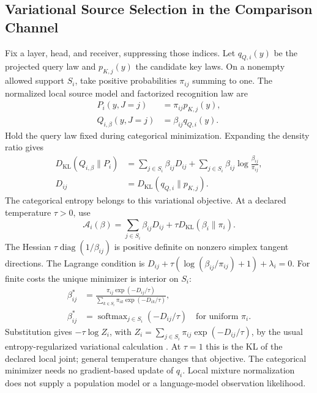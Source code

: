 \documentclass[twoside,11pt]{article}
\begin{document}
\subsection{Variational Source Selection in the Comparison Channel}
\label{sec:mixture_derivation}
Fix a layer, head, and receiver, suppressing those indices. Let $q_{Q,i}(y)$ be the projected query law and $p_{K,j}(y)$ the candidate key laws. On a nonempty allowed support $S_i$, take positive probabilities $\pi_{ij}$ summing to one. The normalized local source model and factorized recognition law are
\begin{align}
P_i(y,J=j)&=\pi_{ij}p_{K,j}(y),\label{eq:mixture_joint}\\
Q_{i,\beta}(y,J=j)&=\beta_{ij}q_{Q,i}(y).\label{eq:mixture_posterior}
\end{align}
Hold the query law fixed during categorical minimization. Expanding the density ratio gives
\begin{align}
D_{\mathrm{KL}}(Q_{i,\beta}\|P_i)
&=\sum_{j\in S_i}\beta_{ij}D_{ij}
+\sum_{j\in S_i}\beta_{ij}\log\frac{\beta_{ij}}{\pi_{ij}},
\label{eq:mixture_free_energy}\\
D_{ij}&=D_{\mathrm{KL}}(q_{Q,i}\|p_{K,j}).
\label{eq:mixture_energy_entropy}
\end{align}
The categorical entropy belongs to this variational objective. At a declared temperature $\tau>0$, use
\begin{equation}
\mathcal A_i(\beta)=\sum_{j\in S_i}\beta_{ij}D_{ij}
+\tau D_{\mathrm{KL}}(\beta_i\|\pi_i).
\label{eq:F_align_canonical_tau}
\end{equation}
The Hessian $\tau\operatorname{diag}(1/\beta_{ij})$ is positive definite on nonzero simplex tangent directions. The Lagrange condition is
$D_{ij}+\tau(\log(\beta_{ij}/\pi_{ij})+1)+\lambda_i=0$.
For finite costs the unique minimizer is interior on $S_i$:
\begin{align}
\beta_{ij}^*&=\frac{\pi_{ij}\exp(-D_{ij}/\tau)}
{\sum_{k\in S_i}\pi_{ik}\exp(-D_{ik}/\tau)},
\label{eq:mixture_softmax_general}\\
\beta_{ij}^*&=\operatorname{softmax}_{j\in S_i}(-D_{ij}/\tau)
\quad\text{for uniform }\pi_i.
\label{eq:mixture_softmax}
\end{align}
Substitution gives $-\tau\log Z_i$, with
$Z_i=\sum_{j\in S_i}\pi_{ij}\exp(-D_{ij}/\tau)$, by the usual entropy-regularized variational calculation \citep{Boyd2004,Wainwright2008}.
At $\tau=1$ this is the KL of the declared local joint; general temperature changes that objective. The categorical minimizer needs no gradient-based update of $q_i$. Local mixture normalization does not supply a population model or a language-model observation likelihood.
\end{document}
